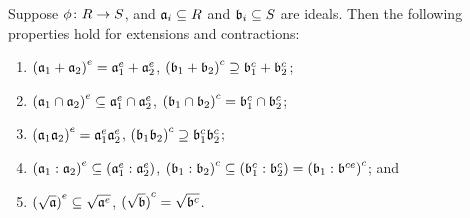 \begin{proposition}\label{prop:extension-contraction-operations}
    Suppose \(\phi\colon R\to S\),
    and \(\mathfrak{a}_i \subseteq R\) and \(\mathfrak{b}_i \subseteq S\) are ideals.
    Then the following properties hold for extensions and contractions:
    \begin{enumerate}[label={(\alph*)}, itemsep=0mm]
        \item \({(\mathfrak{a}_1 + \mathfrak{a}_2)}^e = \mathfrak{a}_1^e + \mathfrak{a}_2^e\),
            \({(\mathfrak{b}_1 + \mathfrak{b}_2)}^c \supseteq \mathfrak{b}_1^c + \mathfrak{b}_2^c\);
        \item \({(\mathfrak{a}_1 \cap \mathfrak{a}_2)}^e \subseteq \mathfrak{a}_1^e \cap \mathfrak{a}_2^e\),
            \({(\mathfrak{b}_1 \cap \mathfrak{b}_2)}^c = \mathfrak{b}_1^c \cap \mathfrak{b}_2^c\);
        \item \({(\mathfrak{a}_1\mathfrak{a}_2)}^e = \mathfrak{a}_1^e\mathfrak{a}_2^e\),
            \({(\mathfrak{b}_1\mathfrak{b}_2)}^c \supseteq \mathfrak{b}_1^c\mathfrak{b}_2^c\);
        \item \({(\mathfrak{a}_1:\mathfrak{a}_2)}^e \subseteq (\mathfrak{a}_1^e:\mathfrak{a}_2^e)\),
            \({(\mathfrak{b}_1:\mathfrak{b}_2)}^c \subseteq (\mathfrak{b}_1^c:\mathfrak{b}_2^c) = {(\mathfrak{b}_1:\mathfrak{b}^{ce})}^c\); and
        \item \({(\sqrt{\mathfrak{a}})}^e \subseteq \sqrt{\mathfrak{a}^e}\),
            \({(\sqrt{\mathfrak{b}})}^c = \sqrt{\mathfrak{b}^c}\).
    \end{enumerate}
\end{proposition}
